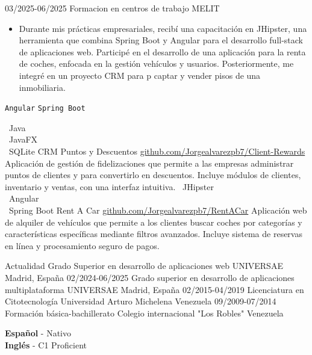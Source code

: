 \documentclass[9pt]{./src/developercv} %
\begin{document}
\vspace{10 pt}
\begin{entrylist}
	\entry
	{03/2025-06/2025}
	{Formacion en centros de trabajo}
	{MELIT}
	{\vspace{-10pt}
		\begin{itemize}[noitemsep,topsep=0pt,parsep=0pt,partopsep=0pt, leftmargin=-1pt]
			\item {Durante mis prácticas empresariales, recibí una capacitación en JHipster, una herramienta que combina Spring Boot y Angular para el desarrollo full-stack de aplicaciones web. Participé en el desarrollo de una aplicación para la renta de coches, enfocada en la gestión vehículos y usuarios. Posteriormente, me integré en un proyecto CRM para p captar y vender pisos de una inmobiliaria.}
		\end{itemize}
		\texttt{Angular} \slashsep \texttt{Spring Boot}}
\end{entrylist}

\begin{entrylist}
	\entry
	{ \textbullet\ Java \\ \textbullet\ JavaFX \\ \textbullet\ SQLite}
	{CRM Puntos y Descuentos}
	{\href {https://github.com/Jorgealvarezpb7/Client-Rewards}          {github.com/Jorgealvarezpb7/Client-Rewards}}
	{Aplicación de gestión de fidelizaciones que permite a las empresas administrar puntos de clientes y para convertirlo en descuentos. Incluye módulos de clientes, inventario y ventas, con una interfaz intuitiva.}
	\entry
	{ \textbullet\ JHipster \\ \textbullet\ Angular \\ \textbullet\ Spring Boot}
	{Rent A Car}
	{\href {https://github.com/Jorgealvarezpb7/RentACar}          {github.com/Jorgealvarezpb7/RentACar}}
	{Aplicación web de alquiler de vehículos que permite a los clientes buscar coches por categorías y características específicas mediante filtros avanzados. Incluye sistema de reservas en línea y procesamiento seguro de pagos.}
\end{entrylist}

\vspace{-10 pt}
\begin{entrylist}
	\entry
	{Actualidad}
	{Grado Superior en desarrollo de aplicaciones web}
	{UNIVERSAE}
	{Madrid, España}
	\entry
	{02/2024-06/2025}
	{Grado superior en desarrollo de aplicaciones multiplataforma}
	{UNIVERSAE}
	{Madrid, España}
	\entry
	{02/2015-04/2019}
	{Licenciatura en Citotecnología}
	{Universidad Arturo Michelena}
	{Venezuela}
	\entry
	{09/2009-07/2014}
	{Formación básica-bachillerato}
	{Colegio internacional "Los Robles"}
	{Venezuela}
\end{entrylist}

\vspace{-10 pt}
\vspace{-6pt}

\textbf{Español} - Nativo \\
\textbf{Inglés} - C1 Proficient
\end{document}

